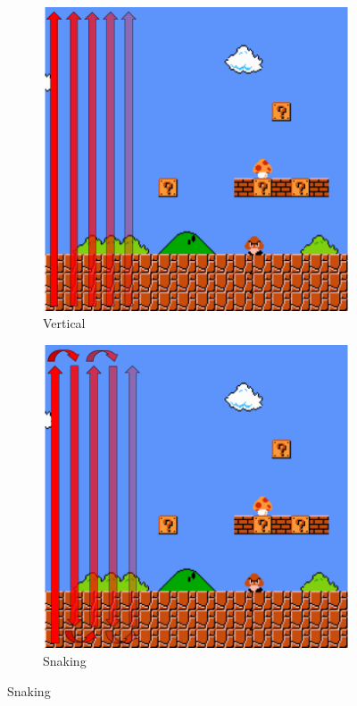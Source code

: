 \documentclass[12pt]{report}
\begin{document}
\begin{figure}[ht]
\begin{subfigure}[t]{0.18\textwidth}
    \includegraphics[width=1\textwidth]{figures/BottomToTop.png} 	       \caption{Vertical}
    \label{fig:vertical}
    \end{subfigure}
    \begin{subfigure}[t]{0.18\textwidth}
    \includegraphics[width=1\textwidth]{figures/Snaking__1_.png} 	       \caption{Snaking}

\end{subfigure}
\end{figure}
\end{document}

